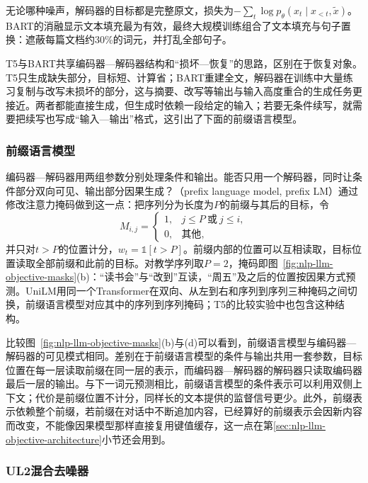 无论哪种噪声，解码器的目标都是完整原文，损失为$-\sum_{t}\log p_\theta(x_t\mid x_{<t},\tilde x)$。BART的消融显示文本填充最为有效，最终大规模训练组合了文本填充与句子置换：遮蔽每篇文档约30\%的词元，并打乱全部句子。

T5与BART共享编码器—解码器结构和“损坏—恢复”的思路，区别在于恢复对象。T5只生成缺失部分，目标短、计算省；BART重建全文，解码器在训练中大量练习复制与改写未损坏的部分，这与摘要、改写等输出与输入高度重合的生成任务更接近。两者都能直接生成，但生成时依赖一段给定的输入；若要无条件续写，就需要把续写也写成“输入—输出”格式，这引出了下面的前缀语言模型。

\subsubsection{前缀语言模型}
\label{sec:nlp-llm-objective-prefix-lm}

编码器—解码器用两组参数分别处理条件和输出。能否只用一个解码器，同时让条件部分双向可见、输出部分因果生成？（prefix language model, prefix LM）通过修改注意力掩码做到这一点：把序列分为长度为$P$的前缀与其后的目标，令
\[
 M_{i,j}=\begin{cases}
 1,& j\leq P\ \text{或}\ j\leq i,\\
 0,& \text{其他},
 \end{cases}
\]
并只对$t>P$的位置计分，$w_t=\mathbb 1[t>P]$。前缀内部的位置可以互相读取，目标位置读取全部前缀和此前的目标。对教学序列取$P=2$，掩码即图~\ref{fig:nlp-llm-objective-masks}(b)：“读书会”与“改到”互读，“周五”及之后的位置按因果方式预测。UniLM用同一个Transformer在双向、从左到右和序列到序列三种掩码之间切换，前缀语言模型对应其中的序列到序列掩码；T5的比较实验中也包含这种结构。

比较图~\ref{fig:nlp-llm-objective-masks}(b)与(d)可以看到，前缀语言模型与编码器—解码器的可见模式相同。差别在于前缀语言模型的条件与输出共用一套参数，目标位置在每一层读取前缀在同一层的表示，而编码器—解码器的解码器只读取编码器最后一层的输出。与下一词元预测相比，前缀语言模型的条件表示可以利用双侧上下文；代价是前缀位置不计分，同样长的文本提供的监督信号更少。此外，前缀表示依赖整个前缀，若前缀在对话中不断追加内容，已经算好的前缀表示会因新内容而改变，不能像因果模型那样直接复用键值缓存，这一点在第\ref{sec:nlp-llm-objective-architecture}小节还会用到。

\subsubsection{UL2混合去噪器}
\label{sec:nlp-llm-objective-ul2}

